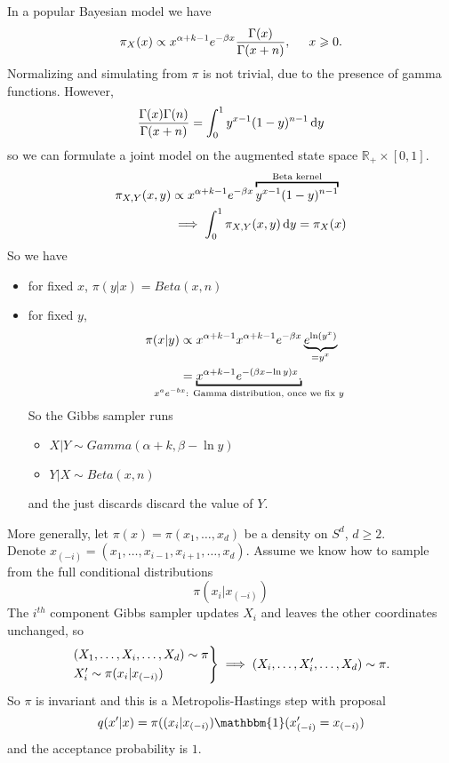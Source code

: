 \documentclass{article}
\begin{document}
	\begin{example}
		In a popular Bayesian model we have 
		\begin{equation*}
			\pi_X (x) \propto x ^{\alpha+k-1} e ^{-\beta x} \frac{\Gamma(x)}{\Gamma(x+n)}, \hspace{0.5 cm } x \geqslant 0.
		\end{equation*}
		Normalizing and simulating from $\pi$ is not trivial, due to the presence of gamma functions. However, 
		\begin{equation*}
			\frac{\Gamma(x)\Gamma(n)}{\Gamma(x+n)}=\int_0^1 y^{x-1}(1-y)^{n-1}\mathop{}\!\mathrm{d} y
		\end{equation*}
		so we can formulate a joint model on the augmented state space $\mathbb{R}_+ \times [0,1]$.
		\begin{align*}
			\pi_{X,Y}(x,y)&\propto x ^{\alpha+k-1} e ^{-\beta x}\overbracket{y^{x-1}(1-y)^{n-1}}^{\text{Beta kernel}}\\
			&\implies\int_0^1 \pi_{X,Y}(x,y)\dif y=\pi_X(x)
		\end{align*}
		So we have 
		\begin{itemize}
			\item for fixed $x$, $\pi(y|x)= Beta(x,n) $
			\item  for fixed $y$,
			\begin{align*}
				\pi (x|y) &\propto x ^{\alpha+k-1} x ^{\alpha+k-1} e ^{-\beta x} \underbrace{e ^{\ln(y^x)}}_{\mathclap{= y^x}}\\
				&= \underbracket{x ^{\alpha+k-1} e ^{-(\beta x -\ln y)x}.}_{\mathclap{x^ae^{-bx}\text{: Gamma distribution, once we fix }y}}
			\end{align*}
			So the Gibbs sampler runs 
			\begin{itemize}
				\item $X|Y \sim Gamma(\alpha+k, \beta- \ln y)$
				\item $Y|X \sim Beta(x,n)$
			\end{itemize}
			and the just discards discard the value of $Y$.
		\end{itemize}
	\end{example}
	More generally, let $\pi (x)= \pi(x_1, \dots, x_d)$ be a density on $S^d$, $d \geqslant 2$. \\
	Denote $x_{(-i)}=(x_1, \dots,x_{i-1}, x_{i+1}, \dots,  x_d) $. Assume we know how to sample from the full conditional distributions 
	\begin{equation*}
		\pi(x_i |x_{(-i)})
	\end{equation*}
	The $i^{th}$ component Gibbs sampler updates $X_i$ and leaves the other coordinates unchanged, so 
	\[
	\begin{rcases*}
		(X_1,\ldots,X_i,\ldots,X_d)\sim\pi\\
		X_i'\sim\pi(x_i |x_{(-i)})
	\end{rcases*}\implies (X_i,\ldots,X_i',\ldots,X_d)\sim\pi.
	\]
	So $\pi$ is invariant and this is a Metropolis-Hastings step with proposal 
	\begin{equation*}
		q(x'|x) = \pi ((x_i |x_{(-i)}) \mathbbm{1}(x'_{(-i)}= x_{(-i)})
	\end{equation*}
	and the acceptance probability is $1$.
	
\end{document}

